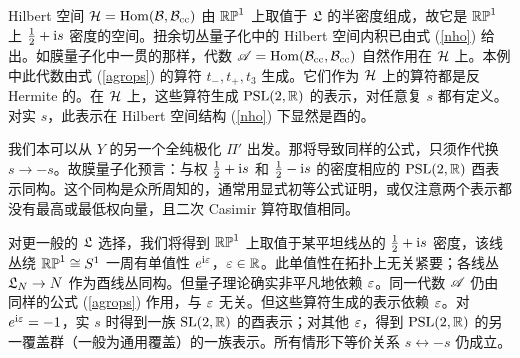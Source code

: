 Hilbert 空间 ${\mathcal H}={\mathrm{Hom}}({\mathcal B},{\mathcal B}_{\mathrm{cc}})$ 由 ${\mathbb{RP}}^1$ 上取值于 ${\mathfrak L}$ 的半密度组成，故它是 ${\mathbb{RP}}^1$ 上 $\frac12+{\mathrm i} s$ 密度的空间。扭余切丛量子化中的 Hilbert 空间内积已由式 (\ref{nho}) 给出。如膜量子化中一贯的那样，代数 ${\mathscr A}={\mathrm{Hom}}({\mathcal B}_{\mathrm{cc}},{\mathcal B}_{\mathrm{cc}})$ 自然作用在 ${\mathcal H}$ 上。本例中此代数由式 (\ref{agrops}) 的算符 $t_-,t_+,t_3$ 生成。它们作为 ${\mathcal H}$ 上的算符都是反 Hermite 的。在 ${\mathcal H}$ 上，这些算符生成 ${\mathrm{PSL}}(2,{\mathbb R})$ 的表示，对任意复 $s$ 都有定义。对实 $s$，此表示在 Hilbert 空间结构 (\ref{nho}) 下显然是酉的。

我们本可以从 $Y$ 的另一个全纯极化 $\varPi'$ 出发。那将导致同样的公式，只须作代换 $s\to-s$。故膜量子化预言：与权 $\frac12+{\mathrm i} s$ 和 $\frac12-{\mathrm i} s$ 的密度相应的 ${\mathrm{PSL}}(2,{\mathbb R})$ 酉表示同构。这个同构是众所周知的，通常用显式初等公式证明，或仅注意两个表示都没有最高或最低权向量，且二次 Casimir 算符取值相同。

对更一般的 ${\mathfrak L}$ 选择，我们将得到 ${\mathbb{RP}}^1$ 上取值于某平坦线丛的 $\frac12+{\mathrm i} s$ 密度，该线丛绕 ${\mathbb{RP}}^1\cong S^1$ 一周有单值性 $e^{{\mathrm i}\varepsilon}$，$\varepsilon\in{\mathbb R}$。此单值性在拓扑上无关紧要；各线丛 ${\mathfrak L}_N\to N$ 作为酉线丛同构。但量子理论确实非平凡地依赖 $\varepsilon$。同一代数 ${\mathscr A}$ 仍由同样的公式 (\ref{agrops}) 作用，与 $\varepsilon$ 无关。但这些算符生成的表示依赖 $\varepsilon$。对 $e^{{\mathrm i}\varepsilon}=-1$，实 $s$ 时得到一族 ${\mathrm{SL}}(2,{\mathbb R})$ 的酉表示；对其他 $\varepsilon$，得到 ${\mathrm{PSL}}(2,{\mathbb R})$ 的另一覆盖群（一般为通用覆盖）的一族表示。所有情形下等价关系 $s\leftrightarrow-s$ 仍成立。

